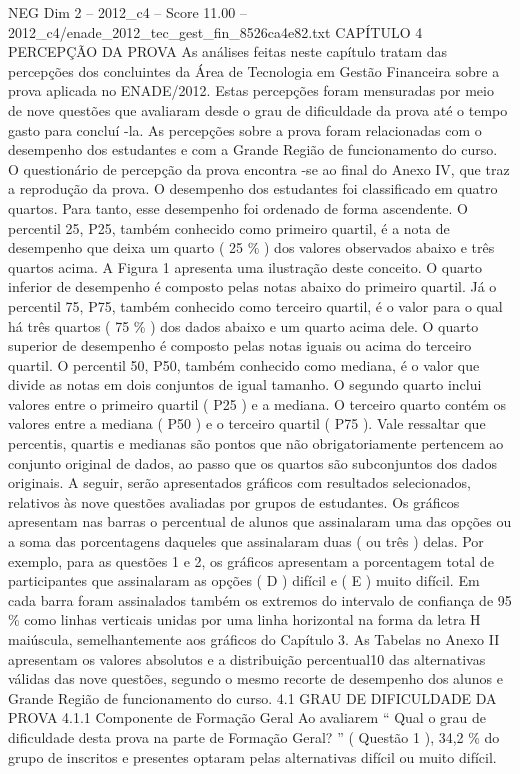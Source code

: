 \begin{textsample}{NEG Dim 2 – 2012\_c4 – Score 11.00 – 2012\_c4/enade\_2012\_tec\_gest\_fin\_8526ca4e82.txt}  \label{ex:f2_neg_332}
CAPÍTULO 4 PERCEPÇÃO DA PROVA As análises feitas neste capítulo tratam das percepções dos concluintes da Área de Tecnologia em Gestão Financeira sobre a prova aplicada no ENADE/2012.
Estas percepções foram mensuradas por meio de nove questões que avaliaram desde o grau de dificuldade da prova até o tempo gasto para concluí -la.
As percepções sobre a prova foram relacionadas com o desempenho dos estudantes e com a Grande Região de funcionamento do curso.
O questionário de percepção da prova encontra -se ao final do Anexo IV, que traz a reprodução da prova.
O desempenho dos estudantes foi classificado em quatro quartos.
Para tanto, esse desempenho foi ordenado de forma ascendente.
O percentil 25, P25, também conhecido como primeiro quartil, é a nota de desempenho que deixa um quarto ( 25 \% ) dos valores observados abaixo e três quartos acima.
A Figura 1 apresenta uma ilustração deste conceito.
O quarto inferior de desempenho é composto pelas notas abaixo do primeiro quartil.
Já o percentil 75, P75, também conhecido como terceiro quartil, é o valor para o qual há três quartos ( 75 \% ) dos dados abaixo e um quarto acima dele.
O quarto superior de desempenho é composto pelas notas iguais ou acima do terceiro quartil.
O percentil 50, P50, também conhecido como mediana, é o valor que divide as notas em dois conjuntos de igual tamanho.
O segundo quarto inclui valores entre o primeiro quartil ( P25 ) e a mediana.
O terceiro quarto contém os valores entre a mediana ( P50 ) e o terceiro quartil ( P75 ).
Vale ressaltar que percentis, quartis e medianas são pontos que não obrigatoriamente pertencem ao conjunto original de dados, ao passo que os quartos são subconjuntos dos dados originais.
A seguir, serão apresentados gráficos com resultados selecionados, relativos às nove questões avaliadas por grupos de estudantes.
Os gráficos apresentam nas barras o percentual de alunos que assinalaram uma das opções ou a soma das porcentagens daqueles que assinalaram duas ( ou três ) delas.
Por exemplo, para as questões 1 e 2, os gráficos apresentam a porcentagem total de participantes que assinalaram as opções ( D ) difícil e ( E ) muito difícil.
Em cada barra foram assinalados também os extremos do intervalo de confiança de 95 \% como linhas verticais unidas por uma linha horizontal na forma da letra H maiúscula, semelhantemente aos gráficos do Capítulo 3.
As Tabelas no Anexo II apresentam os valores absolutos e a distribuição percentual10 das alternativas válidas das nove questões, segundo o mesmo recorte de desempenho dos alunos e Grande Região de funcionamento do curso. 4.1 GRAU DE DIFICULDADE DA PROVA 4.1.1 Componente de Formação Geral Ao avaliarem “ Qual o grau de dificuldade desta prova na parte de Formação Geral? ” ( Questão 1 ), 34,2 \% do grupo de inscritos e presentes optaram pelas alternativas difícil ou muito difícil.

\end{textsample}
